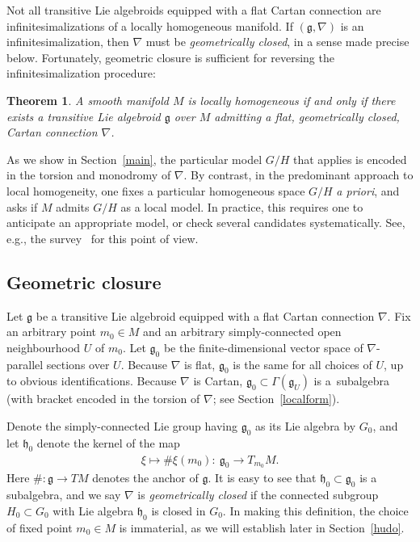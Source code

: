 \documentclass[pdftex]{sigma}
\numberwithin{equation}{section}
\newtheorem{TheoremBlaom}{Theorem}[section]
\begin{document}
Not all transitive Lie algebroids equipped with a f\/lat Cartan
connection are inf\/initesimali\-za\-tions of a locally homogeneous
manifold. If $({\mathfrak g}, \nabla)$ is an inf\/initesimalization,
then $\nabla $ must be {\it geometrically closed}, in a sense made
precise below. Fortunately, geometric closure is suf\/f\/icient for
reversing the inf\/initesimalization procedure:

\begin{TheoremBlaom}\label{TheoremA}
  A smooth manifold $M$ is locally homogeneous if and only if there
  exists a transitive Lie algebroid $\mathfrak g$ over $M$ admitting a
  flat, geometrically closed, Cartan connection $\nabla$.
\end{TheoremBlaom}


As we show in Section~\ref{main}, the particular model $G/H$ that applies is
encoded in the torsion and monodromy of $\nabla$. By contrast, in the
predominant approach to local homogeneity, one f\/ixes a particular
homogeneous space $G/H$ {\em a priori}, and asks if $M$ admits $G/H$
as a local model. In practice, this requires one to anticipate an
appropriate model, or check several candidates systematically. See,
e.g., the survey~\cite{Goldman_10} for this point of view.

\subsection{Geometric closure}\label{geomclose}

Let ${\mathfrak g} $ be a transitive Lie algebroid equipped with a
f\/lat Cartan connection $\nabla$. Fix an arbitrary point $m_0 \in M$
and an arbitrary simply-connected open neighbourhood $U$ of $m_0$. Let
${\mathfrak g}_0$ be the f\/inite-dimensional vector space of $\nabla
$-parallel sections over $U$. Because $\nabla$ is f\/lat, ${\mathfrak
  g}_0$ is the same for all choices of $U$, up to obvious
identif\/ications. Because $\nabla$ is Cartan, ${\mathfrak g}_0 \subset
\Gamma({\mathfrak g}_U)$ is a~subalgebra (with bracket encoded in the
torsion of $\nabla $; see Section~\ref{localform}).

Denote the simply-connected Lie group having ${\mathfrak g}_0 $ as its
Lie algebra by $G_0$, and let ${\mathfrak h}_0$ denote the kernel of
the map
\begin{gather*}
  \xi \mapsto \#\xi (m_0) \colon \  {\mathfrak g}_0 \rightarrow
  T_{m_0}M.
\end{gather*}
Here $\# \colon {\mathfrak g} \rightarrow TM$ denotes the anchor of
$\mathfrak g$. It is easy to see that ${\mathfrak h}_0 \subset
{\mathfrak g}_0$ is a subalgebra, and we say $\nabla $ is {\it
  geometrically closed} if the connected subgroup $H_0 \subset G_0$
with Lie algebra ${\mathfrak h}_0$ is closed in $G_0$. In making this
def\/inition, the choice of f\/ixed point $m_0 \in M$ is immaterial, as we
will establish later in Section~\ref{hudo}.
\end{document}
